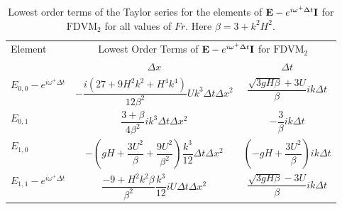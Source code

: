 \begin{table}
	\centering
	\begin{tabular}{l c c}
		\hline
		Element & \multicolumn{2}{c}{Lowest Order Terms of $\mathbf{E} - e^{i \omega^+ \Delta t} \mathbf{I}$ for $\text{FDVM}_2$}\T \B  \\
		\cline{2-3}
		& $\Delta x$&$\Delta t$\T \B  \\
		\hline
		$E_{0,0} -  e^{i \omega^+ \Delta t} $& $ -\dfrac{i \left(27 + 9H^2k^2 + H^4k^4\right)}{12\beta^2} U k^3 \Delta t \Delta x^2$ & $\dfrac{\sqrt{3gH \beta} + 3U}{\beta} ik \Delta t$ \T \B  \\
		$E_{0,1}$& $ \dfrac{3 + \beta}{4 \beta^2}i k^3\Delta  t\Delta x^2$ &$ - \dfrac{3}{\beta} ik\Delta t$ \T \B \\
		$E_{1,0}$& $ -\left(gH + \dfrac{3U^2}{\beta} + \dfrac{9U^2}{\beta^2}\right)  \dfrac{k^3}{12}\Delta t\Delta x^2$ &$ \left(-gH + \dfrac{3U^2}{\beta}\right)ik \Delta t$ \T \B  \\
		$E_{1,1} -  e^{i \omega^+ \Delta t}$& $ \dfrac{-9 + H^2k^2\beta}{\beta^2} \dfrac{k^3}{12} i U \Delta t\Delta x^2$ & $\dfrac{\sqrt{3gH \beta} - 3U}{\beta} ik \Delta t$ \T \B  \\
		\hline 
	\end{tabular}
	\caption{Lowest order terms of the Taylor series for the elements of $\mathbf{E} - e^{i \omega^+ \Delta t} \mathbf{I}$ for $\text{FDVM}_2$ for all values of $Fr$. Here $\beta = 3 + k^2 H^2$.}
	\label{tab:EerrFDVM2} 
\end{table}

